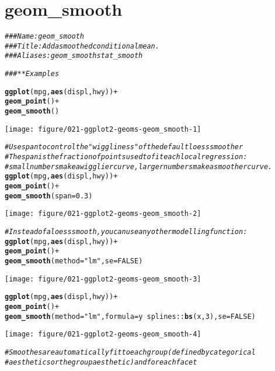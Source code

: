 \documentclass[a4paper,titlepage]{tufte-handout}\usepackage[]{graphicx}\usepackage[]{color}
\makeatletter
\def\maxwidth{ %
  \ifdim\Gin@nat@width>\linewidth
    \linewidth
  \else
    \Gin@nat@width
  \fi
}
\newcommand{\hlnum}[1]{\textcolor[rgb]{0.686,0.059,0.569}{#1}}%
\newcommand{\hlstr}[1]{\textcolor[rgb]{0.192,0.494,0.8}{#1}}%
\newcommand{\hlcom}[1]{\textcolor[rgb]{0.678,0.584,0.686}{\textit{#1}}}%
\newcommand{\hlopt}[1]{\textcolor[rgb]{0,0,0}{#1}}%
\newcommand{\hlstd}[1]{\textcolor[rgb]{0.345,0.345,0.345}{#1}}%
\newcommand{\hlkwc}[1]{\textcolor[rgb]{0.333,0.667,0.333}{#1}}%
\newcommand{\hlkwd}[1]{\textcolor[rgb]{0.737,0.353,0.396}{\textbf{#1}}}%
\newenvironment{kframe}{%
 \def\at@end@of@kframe{}%
 \ifinner\ifhmode%
  \def\at@end@of@kframe{\end{minipage}}%
  \begin{minipage}{\columnwidth}%
 \fi\fi%
 \def\FrameCommand##1{\hskip\@totalleftmargin \hskip-\fboxsep
 \colorbox{shadecolor}{##1}\hskip-\fboxsep
     \hskip-\linewidth \hskip-\@totalleftmargin \hskip\columnwidth}%
 \MakeFramed {\advance\hsize-\width
   \@totalleftmargin\z@ \linewidth\hsize
   \@setminipage}}%
 {\par\unskip\endMakeFramed%
 \at@end@of@kframe}
\newenvironment{knitrout}{}{} %
\makeatother
\begin{document}
\section{geom\_smooth}

\begin{knitrout}
\color{fgcolor}\begin{kframe}
\begin{alltt}
\hlcom{### Name: geom_smooth}
\hlcom{### Title: Add a smoothed conditional mean.}
\hlcom{### Aliases: geom_smooth stat_smooth}

\hlcom{### ** Examples}

\hlkwd{ggplot}\hlstd{(mpg,} \hlkwd{aes}\hlstd{(displ, hwy))} \hlopt{+}
  \hlkwd{geom_point}\hlstd{()} \hlopt{+}
  \hlkwd{geom_smooth}\hlstd{()}
\end{alltt}
\end{kframe}
\texttt{[image: figure/021-ggplot2-geoms-geom\_smooth-1]} 
\begin{kframe}\begin{alltt}
\hlcom{# Use span to control the "wiggliness" of the default loess smoother}
\hlcom{# The span is the fraction of points used to fit each local regression:}
\hlcom{# small numbers make a wigglier curve, larger numbers make a smoother curve.}
\hlkwd{ggplot}\hlstd{(mpg,} \hlkwd{aes}\hlstd{(displ, hwy))} \hlopt{+}
  \hlkwd{geom_point}\hlstd{()} \hlopt{+}
  \hlkwd{geom_smooth}\hlstd{(}\hlkwc{span} \hlstd{=} \hlnum{0.3}\hlstd{)}
\end{alltt}
\end{kframe}
\texttt{[image: figure/021-ggplot2-geoms-geom\_smooth-2]} 
\begin{kframe}\begin{alltt}
\hlcom{# Instead of a loess smooth, you can use any other modelling function:}
\hlkwd{ggplot}\hlstd{(mpg,} \hlkwd{aes}\hlstd{(displ, hwy))} \hlopt{+}
  \hlkwd{geom_point}\hlstd{()} \hlopt{+}
  \hlkwd{geom_smooth}\hlstd{(}\hlkwc{method} \hlstd{=} \hlstr{"lm"}\hlstd{,} \hlkwc{se} \hlstd{=} \hlnum{FALSE}\hlstd{)}
\end{alltt}
\end{kframe}
\texttt{[image: figure/021-ggplot2-geoms-geom\_smooth-3]} 
\begin{kframe}\begin{alltt}
\hlkwd{ggplot}\hlstd{(mpg,} \hlkwd{aes}\hlstd{(displ, hwy))} \hlopt{+}
  \hlkwd{geom_point}\hlstd{()} \hlopt{+}
  \hlkwd{geom_smooth}\hlstd{(}\hlkwc{method} \hlstd{=} \hlstr{"lm"}\hlstd{,} \hlkwc{formula} \hlstd{= y} \hlopt{~} \hlstd{splines}\hlopt{::}\hlkwd{bs}\hlstd{(x,} \hlnum{3}\hlstd{),} \hlkwc{se} \hlstd{=} \hlnum{FALSE}\hlstd{)}
\end{alltt}
\end{kframe}
\texttt{[image: figure/021-ggplot2-geoms-geom\_smooth-4]} 
\begin{kframe}\begin{alltt}
\hlcom{# Smoothes are automatically fit to each group (defined by categorical}
\hlcom{# aesthetics or the group aesthetic) and for each facet}


\end{alltt}
\end{kframe}
\end{knitrout}
\end{document}

